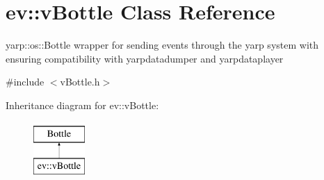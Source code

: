 \hypertarget{classev_1_1vBottle}{}\section{ev\+:\+:v\+Bottle Class Reference}
\label{classev_1_1vBottle}


yarp\+::os\+::\+Bottle wrapper for sending events through the yarp system with ensuring compatibility with yarpdatadumper and yarpdataplayer  




{\ttfamily \#include $<$v\+Bottle.\+h$>$}

Inheritance diagram for ev\+:\+:v\+Bottle\+:\begin{figure}[H]
\begin{center}
\leavevmode
\includegraphics[height=2.000000cm]{classev_1_1vBottle}
\end{center}
\end{figure}
